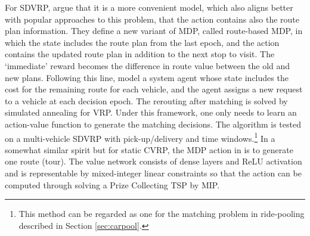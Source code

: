 \documentclass{article}
\begin{document}
For SDVRP, \cite{ulmer2020modeling} argue that it is a more convenient model, which also aligns better with popular approaches to this problem, that the action contains also the route plan information. They define a new variant of MDP, called route-based MDP, in which the state includes the route plan from the last epoch, and the action contains the updated route plan in addition to the next stop to visit. The `immediate' reward becomes the difference in route value between the old and new plans. Following this line, \cite{joe2020deep} model a system agent whose state includes the cost for the remaining route for each vehicle, and the agent assigns a new request to a vehicle at each decision epoch. The rerouting after matching is solved by simulated annealing for VRP. Under this framework, one only needs to learn an action-value function to generate the matching decisions. The algorithm is tested on a multi-vehicle SDVRP with pick-up/delivery and time windows.\footnote{This method can be regarded as one for the matching problem in ride-pooling described in Section \ref{sec:carpool}.} In a somewhat similar spirit but for static CVRP, the MDP action in \citep{delarue2020reinforcement} is to generate one route (tour). The value network consists of dense layers and ReLU activation and is representable by mixed-integer linear constraints so that the action can be computed through solving a Prize Collecting TSP by MIP.
\end{document}
